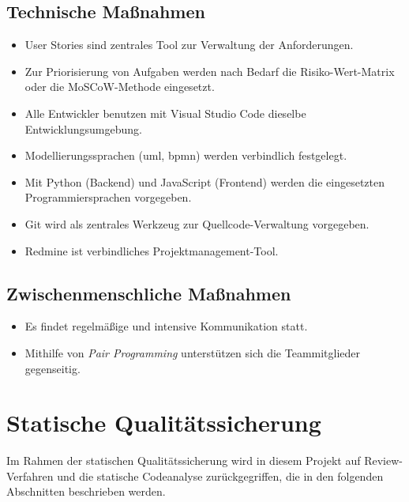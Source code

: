 \documentclass[a4paper,11pt,listof=numbered,glossary=totoc,parskip=half,toc=bib]{scrreprt}
\begin{document}
	\subsection{Technische Maßnahmen}
	\begin{itemize}
		\item User Stories sind zentrales Tool zur Verwaltung der Anforderungen.
		\item Zur Priorisierung von Aufgaben werden nach Bedarf die Risiko-Wert-Matrix oder die MoSCoW-Methode eingesetzt. 
		\item Alle Entwickler benutzen mit Visual Studio Code dieselbe Entwicklungsumgebung.
		\item Modellierungssprachen (\Gls{uml}, \Gls{bpmn}) werden verbindlich festgelegt.
		\item Mit Python (Backend) und JavaScript (Frontend) werden die eingesetzten Programmiersprachen vorgegeben.
		\item Git wird als zentrales Werkzeug zur Quellcode-Verwaltung vorgegeben.
		\item Redmine ist verbindliches Projektmanagement-Tool.
	\end{itemize}
	
	\subsection{Zwischenmenschliche Maßnahmen}
	\begin{itemize}
		\item Es findet regelmäßige und intensive Kommunikation statt.
		\item Mithilfe von \textit{Pair Programming} unterstützen sich die Teammitglieder gegenseitig.
	\end{itemize}		
	
\section{Statische Qualitätssicherung}
Im Rahmen der statischen Qualitätssicherung wird in diesem Projekt auf Review-Verfahren und die statische Codeanalyse zurückgegriffen, die in den folgenden Abschnitten beschrieben werden. 
	
\end{document}
